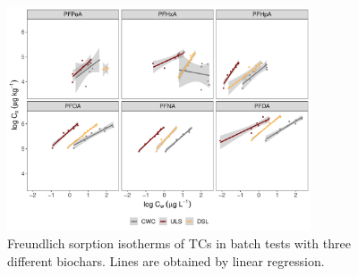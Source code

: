 \begin{figure}[tb]
    \centering
    \includegraphics[width=0.8\textwidth]{R/figs/Sorption_isotherms_single_BC.pdf}
    \caption{Freundlich sorption isotherms of TCs in batch tests with three different biochars. Lines are obtained by linear regression.}
    \label{fig:sorption_isotherms}
\end{figure}

